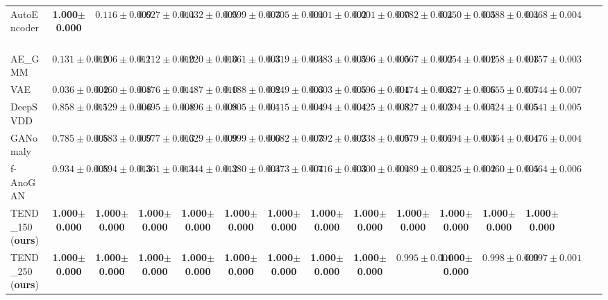 \documentclass[12pt]{spieman}  %
\begin{document}
\begin{spacing}{2}
\begin{table} [htp]
{\begin{tabular}{|l|cccc|cccc|cccc|cccc|}
AutoEncoder~\cite{mcclelland1986parallel}    & {\textbf{1.000$\pm$0.000}}    &  {$0.116\pm0.009$}    & {$0.627\pm0.014$} & {$0.032\pm0.005$}   & {$0.999\pm0.003$}   & {$0.705\pm0.004$}  & {$0.901\pm0.002$}   & {$0.001\pm0.000$}  & {$0.782\pm0.004$} & {$0.250\pm0.005$} & {$0.388\pm0.004$} & {$0.368\pm0.004$} \\
AE\_GMM      & {$0.131\pm0.010$}    &  {$0.206\pm0.011$}    & {$0.212\pm0.010$}  & {$0.220\pm0.010$}  & {$0.361\pm0.003$}   & {$0.319\pm0.004$}  & {$0.383\pm0.005$}  & {$0.396\pm0.005$}  & {$0.067\pm0.002$} & {$0.054\pm0.002$} & {$0.158\pm0.003$} & {$0.157\pm0.003$} \\
VAE~\cite{an2015variational:an}      & {$0.036\pm0.002$}    & {$0.460\pm0.008$}   & {$0.476\pm0.011$}  & {$0.487\pm0.010$}    & {$0.188\pm0.002$}   & {$0.849\pm0.003$}  & {$0.603\pm0.005$}   & {$0.596\pm0.004$}  & {$0.174\pm0.003$} & {$0.627\pm0.006$} & {$0.555\pm0.007$} & {$0.544\pm0.007$} \\
DeepSVDD~\cite{ruff2018deep:ruff}        & {$0.858\pm0.011$}   & {$0.529\pm0.006$}   & {$0.495\pm0.008$} & {$0.496\pm0.008$}  & {$0.905\pm0.001$}     & {$0.415\pm0.004$}   &  {$0.494\pm0.004$}  & {$0.425\pm0.003$} & {$0.827\pm0.003$}  & {$0.294\pm0.004$}  & {$0.524\pm0.005$}  & {$0.541\pm0.005$} \\
GANomaly~\cite{akcay2018ganomaly:akcay}          & {$0.785\pm0.008$}    & {$0.583\pm0.009$}    & {$0.577\pm0.013$}  & {$0.629\pm0.009$}  & {$0.999\pm0.000$}  & {$0.682\pm0.003$}   & {$0.792\pm0.003$}  & {$0.238\pm0.005$}  & {$0.979\pm0.001$} & {$0.694\pm0.003$}& {$0.464\pm0.004$} & {$0.476\pm0.004$} \\
f-AnoGAN~\cite{schlegl2019f}  & {$0.934\pm0.008$}     & {$0.594\pm0.013$}    & {$0.361\pm0.014$}  & {$0.344\pm0.012$}  & {$0.380\pm0.004$}  & {$0.373\pm0.004$}  & {$0.716\pm0.003$}  & {$0.300\pm0.004$}  & {$0.989\pm0.001$} & {$0.825\pm0.002$} & {$0.460\pm0.005$} & {$0.464\pm0.006$} \\
\hline
TEND\_150 (\textbf{ours})    & {\textbf{1.000$\pm$0.000}} & {\textbf{1.000$\pm$0.000}}      & {\textbf{1.000$\pm$0.000}} & {\textbf{1.000$\pm$0.000}}   & {\textbf{1.000$\pm$0.000}}       & {\textbf{1.000$\pm$0.000}}     & {\textbf{1.000$\pm$0.000}}   & {\textbf{1.000$\pm$0.000}}   & {\textbf{1.000$\pm$0.000}} & {\textbf{1.000$\pm$0.000}} & {\textbf{1.000$\pm$0.000}} & {\textbf{1.000$\pm$0.000}} \\
TEND\_250 (\textbf{ours})   & {\textbf{1.000$\pm$0.000}}       & {\textbf{1.000$\pm$0.000}}     & {\textbf{1.000$\pm$0.000}} &  {\textbf{1.000$\pm$0.000}} & {\textbf{1.000$\pm$0.000}}     & {\textbf{1.000$\pm$0.000}}     & {\textbf{1.000$\pm$0.000}}  & {\textbf{1.000$\pm$0.000}}   & {$0.995\pm0.001$}  &  {\textbf{1.000$\pm$0.000}} & {$0.998\pm0.000$} & {$0.997\pm0.001$}\\ 

\end{tabular}}
\end{table}
\end{spacing}
\end{document}
